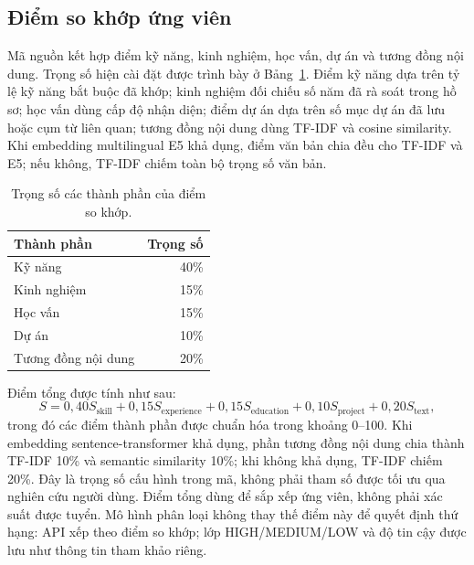 \subsection{Điểm so khớp ứng viên}
Mã nguồn kết hợp điểm kỹ năng, kinh nghiệm, học vấn, dự án và tương đồng nội dung. Trọng số hiện cài đặt được trình bày ở Bảng~\ref{tab:trongso}. Điểm kỹ năng dựa trên tỷ lệ kỹ năng bắt buộc đã khớp; kinh nghiệm đối chiếu số năm đã rà soát trong hồ sơ; học vấn dùng cấp độ nhận diện; điểm dự án dựa trên số mục dự án đã lưu hoặc cụm từ liên quan; tương đồng nội dung dùng TF-IDF và cosine similarity. Khi embedding multilingual E5 khả dụng, điểm văn bản chia đều cho TF-IDF và E5; nếu không, TF-IDF chiếm toàn bộ trọng số văn bản.

\begin{table}[H]
\centering
\caption{Trọng số các thành phần của điểm so khớp.}
\label{tab:trongso}
\begin{tabular}{lr}
\toprule
\textbf{Thành phần} & \textbf{Trọng số} \\
\midrule
Kỹ năng & 40\% \\
Kinh nghiệm & 15\% \\
Học vấn & 15\% \\
Dự án & 10\% \\
Tương đồng nội dung & 20\% \\
\bottomrule
\end{tabular}
\end{table}

Điểm tổng được tính như sau:
\begin{equation}
S = 0{,}40S_{\text{skill}} + 0{,}15S_{\text{experience}} + 0{,}15S_{\text{education}} + 0{,}10S_{\text{project}} + 0{,}20S_{\text{text}},
\label{eq:matching-score}
\end{equation}
trong đó các điểm thành phần được chuẩn hóa trong khoảng 0--100. Khi embedding sentence-transformer khả dụng, phần tương đồng nội dung chia thành TF-IDF 10\% và semantic similarity 10\%; khi không khả dụng, TF-IDF chiếm 20\%. Đây là trọng số cấu hình trong mã, không phải tham số được tối ưu qua nghiên cứu người dùng. Điểm tổng dùng để sắp xếp ứng viên, không phải xác suất được tuyển. Mô hình phân loại không thay thế điểm này để quyết định thứ hạng: API xếp theo điểm so khớp; lớp HIGH/MEDIUM/LOW và độ tin cậy được lưu như thông tin tham khảo riêng.

